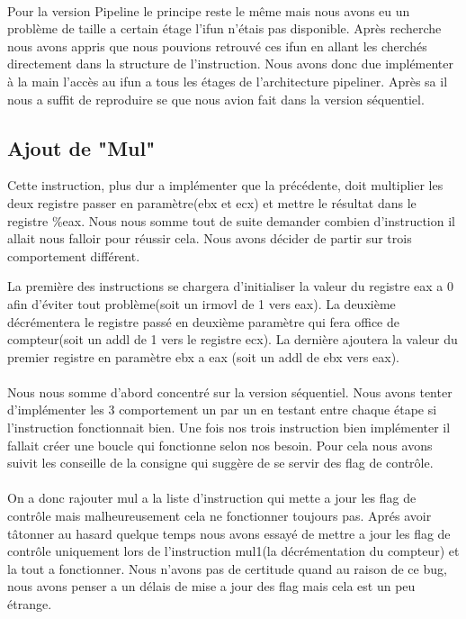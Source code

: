 \documentclass[12pt]{article}
\begin{document}
\paragraph{}Pour la version Pipeline le principe reste le même mais nous avons eu un problème de taille a certain étage l'ifun n'étais pas disponible. Après recherche nous avons appris que nous pouvions retrouvé ces ifun en allant les cherchés directement dans la structure de l'instruction. Nous avons donc due implémenter à la main l’accès au ifun a tous les étages de l’architecture pipeliner. Après sa il nous a suffit de reproduire se que nous avion fait dans la version séquentiel.

\subsection{Ajout de "Mul"}

Cette instruction, plus dur a implémenter que la précédente, doit multiplier les deux registre passer en paramètre(ebx et ecx) et mettre le résultat dans le registre \%eax. Nous nous somme tout de suite demander combien d'instruction il allait nous falloir pour réussir cela. Nous avons décider de partir sur trois comportement différent.

\paragragh{} La première des instructions se chargera d'initialiser la valeur du registre eax a 0 afin d'éviter tout problème(soit un irmovl de 1 vers eax). La deuxième décrémentera le registre passé en deuxième paramètre qui fera office de compteur(soit un addl de 1 vers le registre ecx). La dernière ajoutera la valeur du premier registre en paramètre ebx a eax (soit un addl de ebx vers eax).

\paragraph{} Nous nous somme d’abord concentré sur la version séquentiel. Nous avons tenter d’implémenter les 3 comportement un par un en testant entre chaque étape si l'instruction fonctionnait bien. Une fois nos trois instruction bien implémenter il fallait créer une boucle qui fonctionne selon nos besoin. Pour cela nous avons suivit les conseille de la consigne qui suggère de se servir des flag de contrôle.

\paragraph{} On a donc rajouter mul a la liste d'instruction qui mette a jour les flag de contrôle mais malheureusement cela ne fonctionner toujours pas. Aprés avoir tâtonner au hasard quelque temps nous avons essayé de mettre a jour les flag de contrôle uniquement lors de l'instruction mul1(la décrémentation du compteur) et la tout a fonctionner. Nous n'avons pas de certitude quand au raison de ce bug, nous avons penser a un délais de mise a jour des flag mais cela est un peu étrange.
\end{document}
